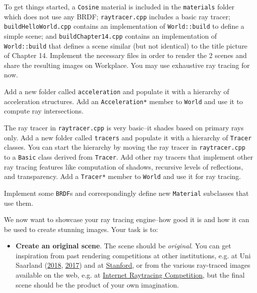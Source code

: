 \documentclass[addpoints]{exam}
\begin{document}
\begin{questions}
  
  To get things started, a \texttt{Cosine} material is included in the \texttt{materials} folder which does not use any BRDF; \texttt{raytracer.cpp} includes a basic ray tracer; \texttt{buildHelloWorld.cpp} contains an implementation of \texttt{World::build} to define a simple scene; and \texttt{buildChapter14.cpp} contains an implementation of \texttt{World::build} that defines a scene similar (but not identical) to the title picture of Chapter 14.
  Implement the necessary files in order to render the 2 scenes and share the resulting images on Workplace. You may use exhaustive ray tracing for now.

  Add a new folder called \texttt{acceleration} and populate it with a hierarchy of acceleration structures. Add an \texttt{Acceleration*} member to \texttt{World} and use it to compute ray intersections.

  The ray tracer in \texttt{raytracer.cpp} is very basic--it shades based on primary rays only. Add a new folder called \texttt{tracers} and populate it with a hierarchy of \texttt{Tracer} classes. You can start the hierarchy by moving the ray tracer in \texttt{raytracer.cpp} to a \texttt{Basic} class derived from \texttt{Tracer}. Add other ray tracers that implement other ray tracing features like computation of shadows, recursive levels of reflections, and transparency. Add a \texttt{Tracer*} member to \texttt{World} and use it for ray tracing.
  
  Implement some \texttt{BRDF}s and correspondingly define new \texttt{Material} subclasses that use them.

  \newpage
  We now want to showcase your ray tracing engine--how good it is and how it can be used to create stunning images. Your task is to:
  \begin{itemize}
  \item \textbf{Create an original scene}. The scene should be \emph{original}. You can get inspiration from past rendering competitions at other institutions, e.g. at Uni Saarland (\href{https://graphics.cg.uni-saarland.de/courses/cg1-2018/#rendering-competition}{2018}, \href{https://graphics.cg.uni-saarland.de/courses/cg1-2017/#rendering-competition}{2017}) and at \href{https://graphics.stanford.edu/courses/cs348b-competition/}{Stanford}, or from the various ray-traced images available on the web, e.g. at \href{http://www.irtc.org/stills/}{Internet Raytracing Competition}, but the final scene should be the product of your own imagination.
    

\end{itemize}
\end{questions}
\end{document}
